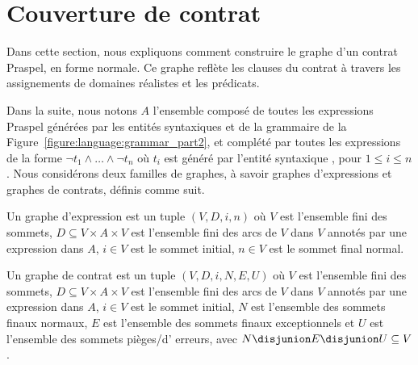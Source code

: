 \section{Couverture de contrat}
\label{section:test:contract}

Dans cette section, nous expliquons comment construire le graphe d'un contrat
Praspel, en forme normale. Ce graphe reflète les clauses du contrat à travers
les assignements de domaines réalistes et les prédicats.

Dans la suite, nous notons $A$ l'ensemble composé de toutes les expressions
Praspel générées par les entités syntaxiques  et
 de la grammaire de la
Figure~\ref{figure:language:grammar_part2}, et complété par toutes les
expressions de la forme $\neg t_1 \land \dots \land \neg t_n$ où $t_i$ est
généré par l'entité syntaxique , pour $1 \leq i \leq
n$. Nous considérons deux familles de graphes, à savoir {\strong graphes
d'expressions} et {\strong graphes de contrats}, définis comme suit.

\begin{definition}

Un {\strong graphe d'expression} est un tuple $(V, D, i, n)$ où $V$ est
l'ensemble fini des {\strong sommets}, $D \subseteq V \times A \times V$ est
l'ensemble fini des {\strong arcs} de $V$ dans $V$ annotés par une {\strong
expression} dans $A$, $i \in V$ est le {\strong sommet initial}, $n \in V$ est
le {\strong sommet final normal}.

\end{definition}

\begin{definition}

Un {\strong graphe de contrat} est un tuple $(V, D, i, N, E, U)$ où $V$ est
l'ensemble fini des {\strong sommets}, $D \subseteq V \times A \times V$ est
l'ensemble fini des {\strong arcs} de $V$ dans $V$ annotés par une expression
dans $A$, $i \in V$ est le {\strong sommet initial}, $N$ est l'ensemble des
{\strong sommets finaux normaux}, $E$ est l'ensemble des {\strong sommets finaux
exceptionnels} et $U$ est l'ensemble des {\strong sommets pièges}/d'{\strong
erreurs}, avec $N \disjunion E \disjunion U \subseteq V$.

\end{definition}

